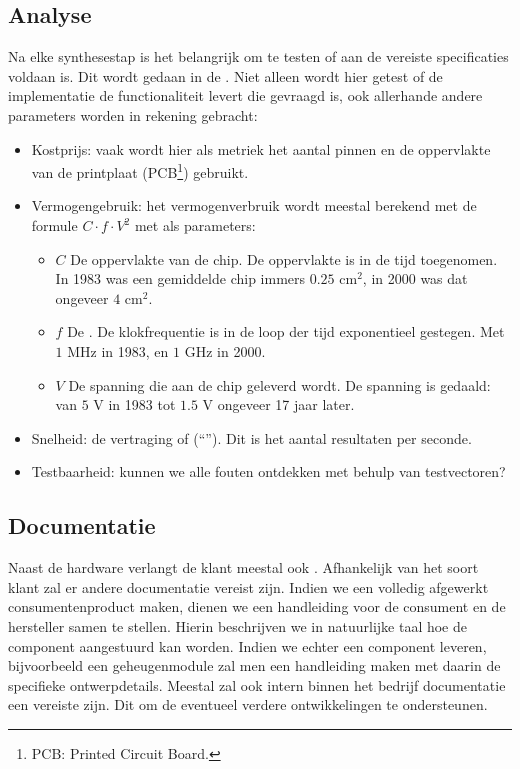\subsection{Analyse}
\label{ss:analyse}
Na elke synthesestap is het belangrijk om te testen of aan de vereiste specificaties voldaan is. Dit wordt gedaan in de . Niet alleen wordt hier getest of de implementatie de functionaliteit levert die gevraagd is, ook allerhande andere parameters worden in rekening gebracht:
\begin{itemize}
 \item Kostprijs: vaak wordt hier als metriek het aantal pinnen en de oppervlakte van de printplaat (PCB\footnote{PCB: Printed Circuit Board.}) gebruikt.
 \item Vermogengebruik: het vermogenverbruik wordt meestal berekend met de formule $C\cdot f\cdot V^2$ met als parameters:
 \begin{itemize}
  \item $C$ De oppervlakte van de chip. De oppervlakte is in de tijd toegenomen. In 1983 was een gemiddelde chip immers $0.25\mbox{ cm}^2$, in 2000 was dat ongeveer $4\mbox{ cm}^2$.
  \item $f$ De . De klokfrequentie is in de loop der tijd exponentieel gestegen. Met $1\mbox{ MHz}$ in 1983, en $1\mbox{ GHz}$ in 2000.
  \item $V$ De spanning die aan de chip geleverd wordt. De spanning is gedaald: van $5\mbox{ V}$ in 1983 tot $1.5\mbox{ V}$ ongeveer 17 jaar later.
 \end{itemize}
 \item Snelheid: de vertraging of  (``''). Dit is het aantal resultaten per seconde.
 \item Testbaarheid: kunnen we alle fouten ontdekken met behulp van testvectoren?
\end{itemize}
\subsection{Documentatie}
\label{ss:documentatie}
Naast de hardware verlangt de klant meestal ook . Afhankelijk van het soort klant zal er andere documentatie vereist zijn. Indien we een volledig afgewerkt consumentenproduct maken, dienen we een handleiding voor de consument en de hersteller samen te stellen. Hierin beschrijven we in natuurlijke taal hoe de component aangestuurd kan worden. Indien we echter een component leveren, bijvoorbeeld een geheugenmodule zal men een handleiding maken met daarin de specifieke ontwerpdetails. Meestal zal ook intern binnen het bedrijf documentatie een vereiste zijn. Dit om de eventueel verdere ontwikkelingen te ondersteunen.
